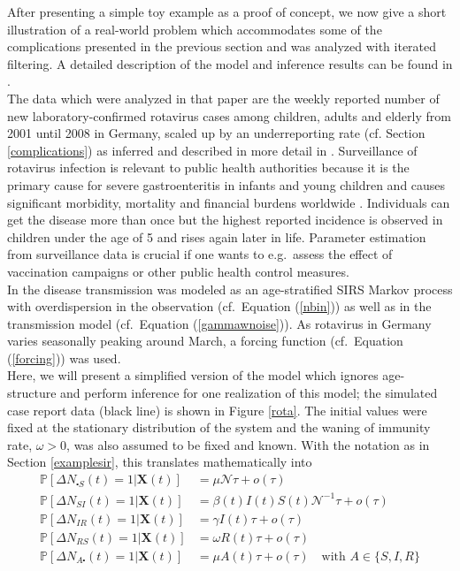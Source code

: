 \label{rota_example}
After presenting a  simple toy example  as a proof of concept, we now  give a short illustration of a real-world problem which accommodates some of the  complications presented in the previous section and was analyzed with iterated filtering. A detailed description of the model and inference results can be found in \cite{Stocks2017}. \\
The data which were analyzed in that paper are the weekly reported number of new laboratory-confirmed rotavirus cases among children, adults and elderly from 2001 until 2008 in Germany, scaled up by an underreporting rate (cf. Section \ref{complications}) as inferred and  described in more detail in  \cite{wei1}.  Surveillance of rotavirus infection is relevant to public health authorities because it is  the primary cause  for severe gastroenteritis in infants and young children  and  causes significant morbidity, mortality and
financial burdens worldwide \citep{wales}. Individuals can get the disease more than once  but the highest reported incidence is observed in children under the age of 5 and rises again later in life. Parameter estimation from surveillance data is crucial  if one wants to  e.g.\ assess the effect of vaccination campaigns or other  public health control
measures. \\
In \cite{Stocks2017} the disease transmission was modeled as an age-stratified SIRS Markov process with overdispersion in the observation (cf.\ Equation (\ref{nbin})) as well as in the transmission model (cf.\ Equation  (\ref{gammawnoise})). 
As rotavirus in Germany varies seasonally peaking around March, a forcing function (cf.\ Equation (\ref{forcing})) was used. \\
Here, we will present a simplified version of the model which ignores age-structure and perform inference for one realization of this model; the simulated case report data (black line) is shown in Figure \ref{rota}.  The initial values were fixed at the stationary distribution of the system and the waning of immunity rate, $\omega>0$, was also assumed to be fixed and known. With the notation as in Section 
\ref{examplesir}, this translates  mathematically into  
 \begin{align}
\mathbb{P}[\Delta N_{\centerdot S}(t)=1 |\bm{X}(t)]&=  \mu \mathcal{N} \tau +o(\tau)  \nonumber \\
\mathbb{P}[\Delta N_{SI}(t)=1 |\bm{X}(t)]&=  \beta(t) I(t) S(t)\mathcal{N}^{-1}\tau +o(\tau) \quad \nonumber \\
\mathbb{P}[\Delta N_{IR}(t)=1 |\bm{X}(t)]&= \gamma I(t)\tau  +o(\tau) \quad\label{jump_rota}\\
\mathbb{P}[\Delta N_{RS}(t)=1 |\bm{X}(t)]&= \omega R(t)\tau +o(\tau)  \nonumber\\
\mathbb{P}[\Delta N_{A \centerdot}(t)=1 |\bm{X}(t)]&= \mu A(t)\tau  +o(\tau) \quad \text{with $A\in \{S,I, R\}$} \nonumber 
\end{align}
